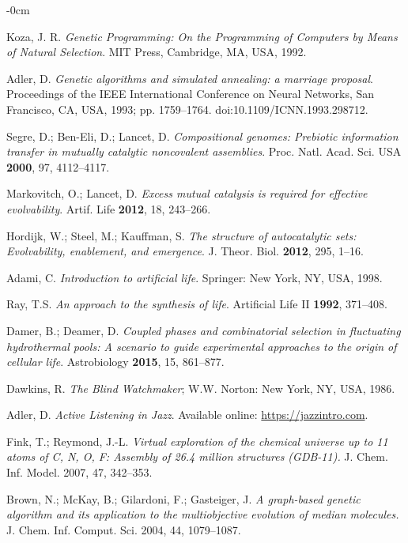 \documentclass[life,article,submit,pdftex,moreauthors]{Definitions/mdpi}
\begin{document}
\begin{adjustwidth}{-\extralength}{0cm}
{\begin{thebibliography}{999}
Koza, J. R.
\textit{Genetic Programming: On the Programming of Computers by Means of Natural Selection}.
MIT Press, Cambridge, MA, USA, 1992.

Adler, D. \textit{Genetic algorithms and simulated annealing: a marriage proposal}. Proceedings of the IEEE International Conference on Neural Networks, San Francisco, CA, USA, 1993; pp. 1759--1764. doi:10.1109/ICNN.1993.298712.

Segre, D.; Ben-Eli, D.; Lancet, D. \textit{Compositional genomes: Prebiotic information transfer in mutually catalytic noncovalent assemblies}. Proc. Natl. Acad. Sci. USA \textbf{2000}, 97, 4112--4117.

Markovitch, O.; Lancet, D. \textit{Excess mutual catalysis is required for effective evolvability}. Artif. Life \textbf{2012}, 18, 243--266.

Hordijk, W.; Steel, M.; Kauffman, S. \textit{The structure of autocatalytic sets: Evolvability, enablement, and emergence}. J. Theor. Biol. \textbf{2012}, 295, 1--16.

Adami, C. \textit{Introduction to artificial life}. Springer: New York, NY, USA, 1998.

Ray, T.S. \textit{An approach to the synthesis of life}. Artificial Life II \textbf{1992}, 371--408.

Damer, B.; Deamer, D. \textit{Coupled phases and combinatorial selection in fluctuating hydrothermal pools: A scenario to guide experimental approaches to the origin of cellular life}. Astrobiology \textbf{2015}, 15, 861--877.


Dawkins, R. \textit{The Blind Watchmaker}; W.W. Norton: New York, NY, USA, 1986.

Adler, D. \textit{Active Listening in Jazz}. Available online: \url{https://jazzintro.com}.

Fink, T.; Reymond, J.-L.
\textit{Virtual exploration of the chemical universe up to 11 atoms of C, N, O, F:
Assembly of 26.4 million structures (GDB-11).}
J. Chem. Inf. Model. 2007, 47, 342--353.

Brown, N.; McKay, B.; Gilardoni, F.; Gasteiger, J.
\textit{A graph-based genetic algorithm and its application to the multiobjective
evolution of median molecules.}
J. Chem. Inf. Comput. Sci. 2004, 44, 1079--1087.


\end{thebibliography}}
\end{adjustwidth}
\end{document}
